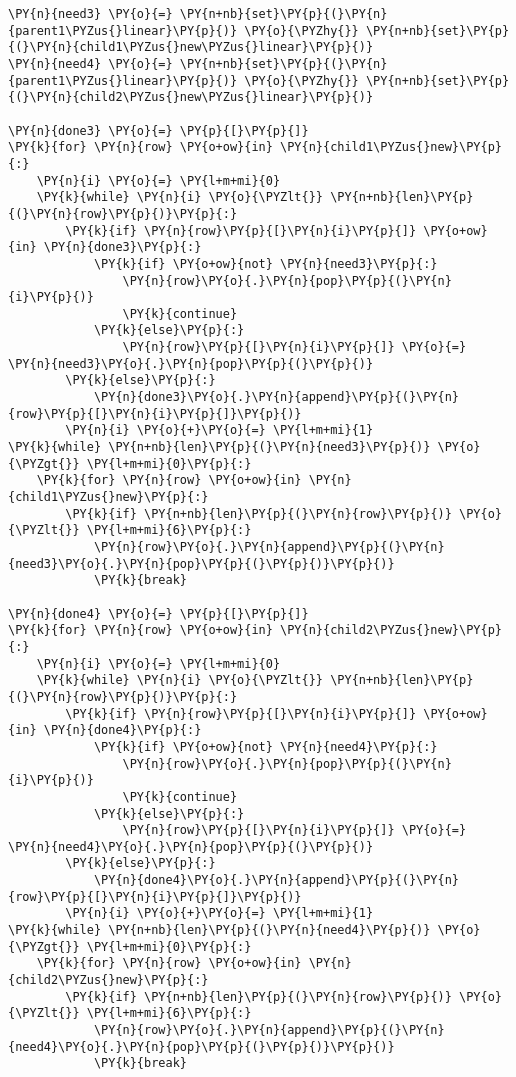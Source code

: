 \begin{tcolorbox}[breakable, size=fbox, boxrule=1pt, pad at break*=1mm,colback=cellbackground, colframe=cellborder]
\begin{Verbatim}[commandchars=\\\{\}]
\PY{n}{need3} \PY{o}{=} \PY{n+nb}{set}\PY{p}{(}\PY{n}{parent1\PYZus{}linear}\PY{p}{)} \PY{o}{\PYZhy{}} \PY{n+nb}{set}\PY{p}{(}\PY{n}{child1\PYZus{}new\PYZus{}linear}\PY{p}{)}
\PY{n}{need4} \PY{o}{=} \PY{n+nb}{set}\PY{p}{(}\PY{n}{parent1\PYZus{}linear}\PY{p}{)} \PY{o}{\PYZhy{}} \PY{n+nb}{set}\PY{p}{(}\PY{n}{child2\PYZus{}new\PYZus{}linear}\PY{p}{)}

\PY{n}{done3} \PY{o}{=} \PY{p}{[}\PY{p}{]}
\PY{k}{for} \PY{n}{row} \PY{o+ow}{in} \PY{n}{child1\PYZus{}new}\PY{p}{:}
    \PY{n}{i} \PY{o}{=} \PY{l+m+mi}{0}
    \PY{k}{while} \PY{n}{i} \PY{o}{\PYZlt{}} \PY{n+nb}{len}\PY{p}{(}\PY{n}{row}\PY{p}{)}\PY{p}{:}
        \PY{k}{if} \PY{n}{row}\PY{p}{[}\PY{n}{i}\PY{p}{]} \PY{o+ow}{in} \PY{n}{done3}\PY{p}{:}
            \PY{k}{if} \PY{o+ow}{not} \PY{n}{need3}\PY{p}{:}
                \PY{n}{row}\PY{o}{.}\PY{n}{pop}\PY{p}{(}\PY{n}{i}\PY{p}{)}
                \PY{k}{continue}
            \PY{k}{else}\PY{p}{:}
                \PY{n}{row}\PY{p}{[}\PY{n}{i}\PY{p}{]} \PY{o}{=} \PY{n}{need3}\PY{o}{.}\PY{n}{pop}\PY{p}{(}\PY{p}{)}
        \PY{k}{else}\PY{p}{:}
            \PY{n}{done3}\PY{o}{.}\PY{n}{append}\PY{p}{(}\PY{n}{row}\PY{p}{[}\PY{n}{i}\PY{p}{]}\PY{p}{)}
        \PY{n}{i} \PY{o}{+}\PY{o}{=} \PY{l+m+mi}{1}
\PY{k}{while} \PY{n+nb}{len}\PY{p}{(}\PY{n}{need3}\PY{p}{)} \PY{o}{\PYZgt{}} \PY{l+m+mi}{0}\PY{p}{:}
    \PY{k}{for} \PY{n}{row} \PY{o+ow}{in} \PY{n}{child1\PYZus{}new}\PY{p}{:}
        \PY{k}{if} \PY{n+nb}{len}\PY{p}{(}\PY{n}{row}\PY{p}{)} \PY{o}{\PYZlt{}} \PY{l+m+mi}{6}\PY{p}{:}
            \PY{n}{row}\PY{o}{.}\PY{n}{append}\PY{p}{(}\PY{n}{need3}\PY{o}{.}\PY{n}{pop}\PY{p}{(}\PY{p}{)}\PY{p}{)}
            \PY{k}{break}

\PY{n}{done4} \PY{o}{=} \PY{p}{[}\PY{p}{]}
\PY{k}{for} \PY{n}{row} \PY{o+ow}{in} \PY{n}{child2\PYZus{}new}\PY{p}{:}
    \PY{n}{i} \PY{o}{=} \PY{l+m+mi}{0}
    \PY{k}{while} \PY{n}{i} \PY{o}{\PYZlt{}} \PY{n+nb}{len}\PY{p}{(}\PY{n}{row}\PY{p}{)}\PY{p}{:}
        \PY{k}{if} \PY{n}{row}\PY{p}{[}\PY{n}{i}\PY{p}{]} \PY{o+ow}{in} \PY{n}{done4}\PY{p}{:}
            \PY{k}{if} \PY{o+ow}{not} \PY{n}{need4}\PY{p}{:}
                \PY{n}{row}\PY{o}{.}\PY{n}{pop}\PY{p}{(}\PY{n}{i}\PY{p}{)}
                \PY{k}{continue}
            \PY{k}{else}\PY{p}{:}
                \PY{n}{row}\PY{p}{[}\PY{n}{i}\PY{p}{]} \PY{o}{=} \PY{n}{need4}\PY{o}{.}\PY{n}{pop}\PY{p}{(}\PY{p}{)}
        \PY{k}{else}\PY{p}{:}
            \PY{n}{done4}\PY{o}{.}\PY{n}{append}\PY{p}{(}\PY{n}{row}\PY{p}{[}\PY{n}{i}\PY{p}{]}\PY{p}{)}
        \PY{n}{i} \PY{o}{+}\PY{o}{=} \PY{l+m+mi}{1}
\PY{k}{while} \PY{n+nb}{len}\PY{p}{(}\PY{n}{need4}\PY{p}{)} \PY{o}{\PYZgt{}} \PY{l+m+mi}{0}\PY{p}{:}
    \PY{k}{for} \PY{n}{row} \PY{o+ow}{in} \PY{n}{child2\PYZus{}new}\PY{p}{:}
        \PY{k}{if} \PY{n+nb}{len}\PY{p}{(}\PY{n}{row}\PY{p}{)} \PY{o}{\PYZlt{}} \PY{l+m+mi}{6}\PY{p}{:}
            \PY{n}{row}\PY{o}{.}\PY{n}{append}\PY{p}{(}\PY{n}{need4}\PY{o}{.}\PY{n}{pop}\PY{p}{(}\PY{p}{)}\PY{p}{)}
            \PY{k}{break}


\end{Verbatim}
\end{tcolorbox}
